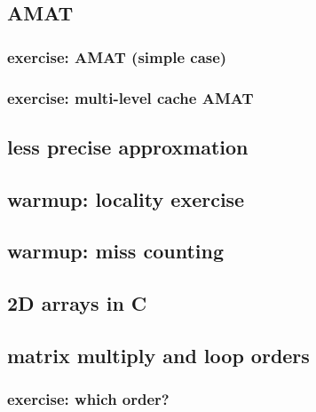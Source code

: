\subsection{AMAT}


\subsubsection{exercise: AMAT (simple case)}


\subsubsection{exercise: multi-level cache AMAT}


\subsection{less precise approxmation}


\subsection{warmup: locality exercise}  %


\subsection{warmup: miss counting}


\subsection{2D arrays in C}



\subsection{matrix multiply and loop orders}

%


\subsubsection{exercise: which order?}


